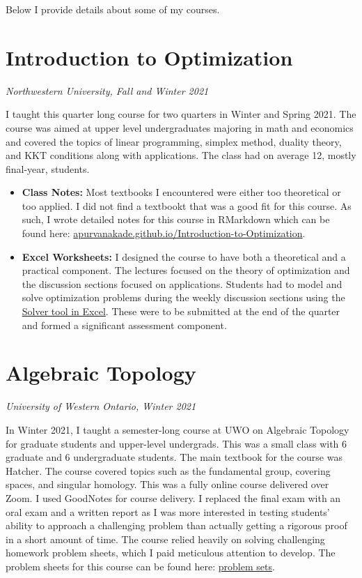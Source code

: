 \documentclass[
]{report}
\begin{document}
Below I provide details about some of my courses.

\hypertarget{introduction-to-optimization}{%
\section{Introduction to Optimization}\label{introduction-to-optimization}}

\emph{Northwestern University, Fall and Winter 2021}

I taught this quarter long course for two quarters in Winter and Spring 2021. The course was aimed at upper level undergraduates majoring in math and economics and covered the topics of linear programming, simplex method, duality theory, and KKT conditions along with applications. The class had on average 12, mostly final-year, students.

\begin{itemize}
\item
  \textbf{Class Notes:}
  Most textbooks I encountered were either too theoretical or too applied. I did not find a textbookt that was a good fit for this course. As such, I wrote detailed notes for this course in RMarkdown which can be found here: \href{https://apurvanakade.github.io/Introduction-to-Optimization/}{apurvanakade.github.io/Introduction-to-Optimization}.
\item
  \textbf{Excel Worksheets:}
  I designed the course to have both a theoretical and a practical component. The lectures focused on the theory of optimization and the discussion sections focused on applications. Students had to model and solve optimization problems during the weekly discussion sections using the \href{https://support.microsoft.com/en-us/office/load-the-solver-add-in-in-excel-612926fc-d53b-46b4-872c-e24772f078ca}{Solver tool in Excel}. These were to be submitted at the end of the quarter and formed a significant assessment component.
\end{itemize}

\hypertarget{algebraic-topology}{%
\section{Algebraic Topology}\label{algebraic-topology}}

\emph{University of Western Ontario, Winter 2021}

In Winter 2021, I taught a semester-long course at UWO on Algebraic Topology for graduate students and upper-level undergrads. This was a small class with 6 graduate and 6 undergraduate students. The main textbook for the course was Hatcher. The course covered topics such as the fundamental group, covering spaces, and singular homology. This was a fully online course delivered over Zoom. I used GoodNotes for course delivery. I replaced the final exam with an oral exam and a written report as I was more interested in testing students' ability to approach a challenging problem than actually getting a rigorous proof in a short amount of time. The course relied heavily on solving challenging homework problem sheets, which I paid meticulous attention to develop. The problem sheets for this course can be found here: \href{https://github.com/apurvnakade/uwo2021-algebraic-topology/tree/main/output}{problem sets}.
\end{document}
